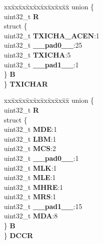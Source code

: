 \begin{DoxyCompactItemize}
\begin{tabbing}
\end{tabbing}\item 
\mbox{\label{structMLB__tag_a0e7c9ce5fb15c31da9bf58543406308e}} 
\begin{tabbing}
xx\=xx\=xx\=xx\=xx\=xx\=xx\=xx\=xx\=\kill
union \{\\
\>uint32\_t {\bfseries R}\\
\>struct \{\\
\>\>uint32\_t {\bfseries TXICHA\_ACEN}:1\\
\>\>uint32\_t {\bfseries \_\_pad0\_\_}:25\\
\>\>uint32\_t {\bfseries TXICHA}:5\\
\>\>uint32\_t {\bfseries \_\_pad1\_\_}:1\\
\>\} {\bfseries B}\\
\} {\bfseries TXICHAR}\\

\end{tabbing}\item 
\mbox{\label{structMLB__tag_a4c8bd6045ba0beec67409ca4832ad81c}} 
\begin{tabbing}
xx\=xx\=xx\=xx\=xx\=xx\=xx\=xx\=xx\=\kill
union \{\\
\>uint32\_t {\bfseries R}\\
\>struct \{\\
\>\>uint32\_t {\bfseries MDE}:1\\
\>\>uint32\_t {\bfseries LBM}:1\\
\>\>uint32\_t {\bfseries MCS}:2\\
\>\>uint32\_t {\bfseries \_\_pad0\_\_}:1\\
\>\>uint32\_t {\bfseries MLK}:1\\
\>\>uint32\_t {\bfseries MLE}:1\\
\>\>uint32\_t {\bfseries MHRE}:1\\
\>\>uint32\_t {\bfseries MRS}:1\\
\>\>uint32\_t {\bfseries \_\_pad1\_\_}:15\\
\>\>uint32\_t {\bfseries MDA}:8\\
\>\} {\bfseries B}\\
\} {\bfseries DCCR}\\


\end{tabbing}
\end{DoxyCompactItemize}
